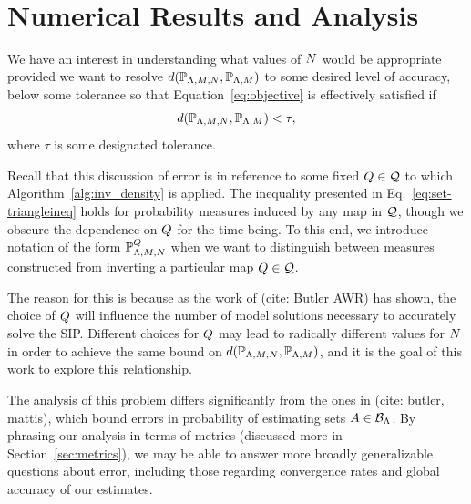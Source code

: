 \
\section{Numerical Results and Analysis}\label{sec:ch03-examples}


We have an interest in understanding what values of $N$ would be appropriate provided we want to resolve $d(\mathbb{P}_{{\Lambda}, M, N}, \mathbb{P}_{{\Lambda}, M})$ to some desired level of accuracy, below some tolerance so that Equation~\eqref{eq:objective} is effectively satisfied if
\begin{equation}\label{eq:newobjective}
d(\mathbb{P}_{{\Lambda}, M, N}, \mathbb{P}_{{\Lambda},M}) < \tau,
\end{equation}
where $\tau$ is some designated tolerance.

Recall that this discussion of error is in reference to some fixed $Q\in\mathcal{Q}$ to which Algorithm~\ref{alg:inv_density} is applied.
The inequality presented in Eq.~\eqref{eq:set-triangleineq} holds for probability measures induced by any map in $\mathcal{Q}$, though we obscure the dependence on $Q$ for the time being.
To this end, we introduce notation of the form $\mathbb{P}_{{\Lambda}, M, N}^{Q}$ when we want to distinguish between measures constructed from inverting a particular map $Q\in\mathcal{Q}$.

The reason for this is because as the work of (cite: Butler AWR) has shown, the choice of $Q$ will influence the number of model solutions necessary to accurately solve the SIP.
Different choices for $Q$ may lead to radically different values for $N$ in order to achieve the same bound on $d(\mathbb{P}_{{\Lambda}, M, N}, \mathbb{P}_{{\Lambda}, M})$, and it is the goal of this work to explore this relationship.

The analysis of this problem differs significantly from the ones in (cite: butler, mattis), which bound errors in probability of estimating sets $A\in\mathcal{B}_{{\Lambda}}$.
By phrasing our analysis in terms of metrics (discussed more in Section~\ref{sec:metrics}), we may be able to answer more broadly generalizable questions about error, including those regarding convergence rates and global accuracy of our estimates.



\FloatBarrier


\FloatBarrier
